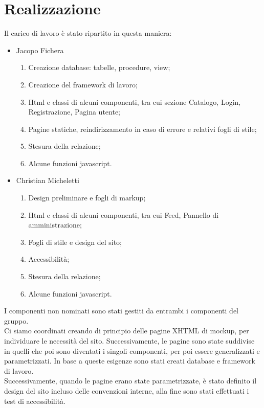 \documentclass[12pt, a4paper]{article}
\begin{document}
    \newpage

    \section{Realizzazione}
    Il carico di lavoro è stato ripartito in questa maniera:
    \begin{itemize}
        \item Jacopo Fichera
        \begin{enumerate}
            \item Creazione database: tabelle, procedure, view;
            \item Creazione del framework di lavoro;
            \item Html e classi di alcuni componenti, tra cui sezione Catalogo, Login, Registrazione, Pagina utente;
            \item Pagine statiche, reindirizzamento in caso di errore e relativi fogli di stile;
            \item Stesura della relazione;
            \item Alcune funzioni javascript.
        \end{enumerate}
        \item Christian Micheletti
        \begin{enumerate}
            \item Design preliminare e fogli di markup;
            \item Html e classi di alcuni componenti, tra cui Feed, Pannello di amministrazione;
            \item Fogli di stile e design del sito;
            \item Accessibilità;
            \item Stesura della relazione;
            \item Alcune funzioni javascript.
        \end{enumerate}
    \end{itemize}
    I componenti non nominati sono stati gestiti da entrambi i componenti del gruppo. \\
    Ci siamo coordinati creando di principio delle pagine XHTML di mockup, per individuare le necessità del sito. Successivamente, le pagine sono state suddivise in quelli che poi sono diventati i singoli componenti, per poi essere generalizzati e parametrizzati. In base a queste esigenze sono stati creati database e framework di lavoro. \\
    Successivamente, quando le pagine erano state parametrizzate, è stato definito il design del sito incluso delle convenzioni interne, alla fine sono stati effettuati i test di accessibilità.
\end{document}
